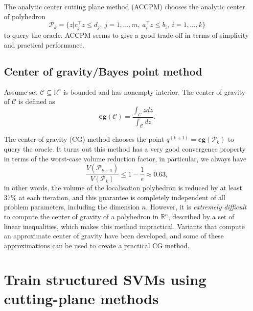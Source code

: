 \documentclass[10pt,a4paper]{article}
\newcommand{\eat}[1]{}
\begin{document}
\eat{citation}

The analytic center cutting plane method (ACCPM) chooses the analytic center of polyhedron 
\begin{equation*}
\mathcal{P}_k = \{ z | c_j^\top z \le d_j, ~ j=1, \dots, m, ~ a_i^\top z \le b_i, ~ i=1, \dots, k \}
\end{equation*}
to query the oracle.
ACCPM seems to give a good trade-off in terms of simplicity and practical performance.

\eat{citation}


\subsection{Center of gravity/Bayes point method}
Assume set $\mathcal{C} \subseteq \mathbb{R}^n$ is bounded and has nonempty interior. 
The center of gravity of $\mathcal{C}$ is defined as
\begin{equation}
\textbf{cg}(\mathcal{C}) = \frac{\int_\mathcal{C} z dz}{\int_\mathcal{C} dz}.
\end{equation}

The center of gravity (CG) method chooses the point $q^{(k+1)} = \textbf{cg}(\mathcal{P}_{k})$ to query the oracle.
It turns out this method has a very good convergence property in terms of the worst-case volume reduction factor,
in particular, we always have
\begin{equation}
\frac{V(\mathcal{P}_{k+1})}{V(\mathcal{P}_{k})} \le 1 - \frac{1}{e} \approx 0.63,
\end{equation}
in other words, the volume of the localisation polyhedron is reduced by at least $37\%$ at each iteration,
and this guarantee is completely independent of all problem parameters, including the dimension $n$.
However, it is \textit{extremely difficult} to compute the center of gravity of a polyhedron in $\mathbb{R}^n$, described by a set of linear inequalities,
which makes this method impractical.
Variants that compute an approximate center of gravity have been developed, and some of these approximations can be used to create a practical CG method.

\eat{citation}



\section{Train structured SVMs using cutting-plane methods}
\label{sec:ssvm}
\end{document}
